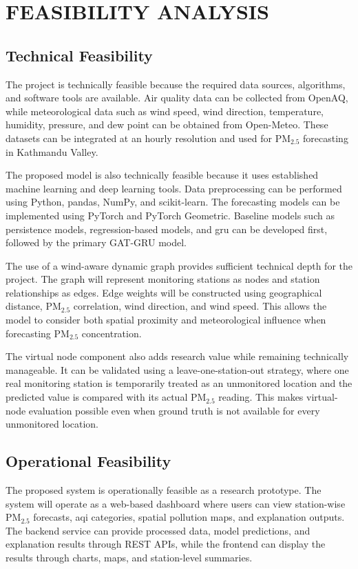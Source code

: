 \chapter{FEASIBILITY ANALYSIS}

\section{Technical Feasibility}
The project is technically feasible because the required data sources, algorithms, and software tools are available. Air quality data can be collected from OpenAQ, while meteorological data such as wind speed, wind direction, temperature, humidity, pressure, and dew point can be obtained from Open-Meteo. These datasets can be integrated at an hourly resolution and used for PM$_{2.5}$ forecasting in Kathmandu Valley.

The proposed model is also technically feasible because it uses established machine learning and deep learning tools. Data preprocessing can be performed using Python, pandas, NumPy, and scikit-learn. The forecasting models can be implemented using PyTorch and PyTorch Geometric. Baseline models such as persistence models, regression-based models, and \gls{gru} can be developed first, followed by the primary GAT-GRU model.

The use of a wind-aware dynamic graph provides sufficient technical depth for the project. The graph will represent monitoring stations as nodes and station relationships as edges. Edge weights will be constructed using geographical distance, PM$_{2.5}$ correlation, wind direction, and wind speed. This allows the model to consider both spatial proximity and meteorological influence when forecasting PM$_{2.5}$ concentration.

The virtual node component also adds research value while remaining technically manageable. It can be validated using a leave-one-station-out strategy, where one real monitoring station is temporarily treated as an unmonitored location and the predicted value is compared with its actual PM$_{2.5}$ reading. This makes virtual-node evaluation possible even when ground truth is not available for every unmonitored location.

\section{Operational Feasibility}
The proposed system is operationally feasible as a research prototype. The system will operate as a web-based dashboard where users can view station-wise PM$_{2.5}$ forecasts, \gls{aqi} categories, spatial pollution maps, and explanation outputs. The backend service can provide processed data, model predictions, and explanation results through REST APIs, while the frontend can display the results through charts, maps, and station-level summaries.

